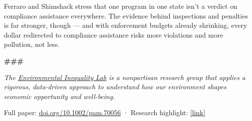 \documentclass[
  11pt,
]{article}
\begin{document}
\vspace{6pt}
\noindent Ferraro and Shimshack stress that one program in one state isn't a verdict on compliance assistance everywhere. The evidence behind inspections and penalties is far stronger, though --- and with enforcement budgets already shrinking, every dollar redirected to compliance assistance risks more violations and more pollution, not less.

\vspace{15pt}


\vspace{11pt}

\begin{center}{\color{faint}\bfseries \#\#\#}\end{center}

\vspace{11pt}

\begin{center}{\color{muted}\itshape\fontsize{9.5pt}{14pt}\selectfont
The \href{https://www.environmental-inequality-lab.org/}{\color{cite}\underline{Environmental Inequality Lab}} is a nonpartisan research group that applies a rigorous, data-driven approach to understand how our environment shapes economic opportunity and well-being.\par}
\end{center}

\vspace{10pt}

\begin{center}{\color{faint}\fontsize{8pt}{11pt}\selectfont
Full paper: \href{https://doi.org/10.1002/pam.70056}{\color{faint}\underline{doi.org/10.1002/pam.70056}} \quad·\quad
Research highlight: \href{[URL]}{\color{faint}\underline{[link]}}\par}
\end{center}
\end{document}

